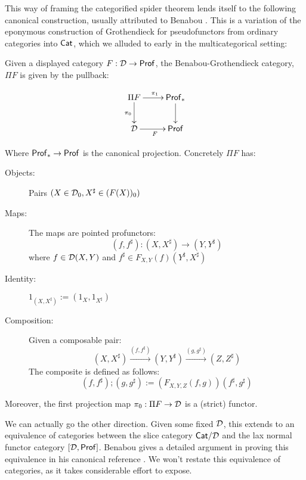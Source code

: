 This way of framing the categorified spider theorem lends itself to the following canonical construction, usually attributed to Benabou \cite{benabou}. This is a variation of the eponymous construction of Grothendieck for pseudofunctors from ordinary categories into ${\sf Cat}$, which we alluded to early in the multicategorical setting:



\begin{theorem}

Given a displayed category $F:\mathcal{D}\to {\sf Prof}$, the Benabou-Grothendieck category,  $\Pi F$ is given by the pullback:

$$
\xymatrix{
\Pi  F \ar[r]^{\pi_1} \ar[d]_{\pi_0} & \Prof_* \ar[d] \\
\D \ar[r]_F & \Prof
}
$$

Where ${\sf Prof}_* \to {\sf Prof}$ is the canonical projection.
Concretely $\Pi F$ has:


\begin{description}
\item[Objects:] Pairs $(X\in \mathcal{D}_0, X^\sharp \in (F(X))_0)$
\item[Maps:] The maps are  pointed profunctors:
$$(f, f^\sharp):(X,X^\sharp )\to (Y,Y^\sharp)$$
 where $f \in \mathcal{D}(X,Y)$ and $f^\sharp \in F_{X,Y}(f)(Y^\sharp,X^\sharp)$
\item[Identity:] $1_{(X,X^\sharp)} := (1_X, 1_{X^\sharp})$
\item[Composition:] Given a composable pair:
$$(X,X^\sharp)\xrightarrow{(f, f^\sharp)} (Y,Y^\sharp)\xrightarrow{(g, g^\sharp)} (Z,Z^\sharp)$$
The composite is defined as follows:
$$(f, f^\sharp);(g, g^\sharp):= (F_{X,Y,Z}(f,g))(f^\sharp, g^\sharp)$$
\end{description}


Moreover, the first projection map $\pi_0:\Pi F\to \mathcal{D}$  is a (strict) functor.
\end{theorem}



We can actually go the other direction.  Given some fixed $\mathcal{D}$, this extends to an equivalence of categories between the slice category ${\sf Cat}/\mathcal{D}$ and the lax normal functor category $[\mathcal{D},{\sf Prof}]$.  Benabou gives a detailed argument in proving this equivalence in his canonical reference \cite{benaboudist}.  We won't restate this equivalence of categories, as it takes considerable effort to expose.





